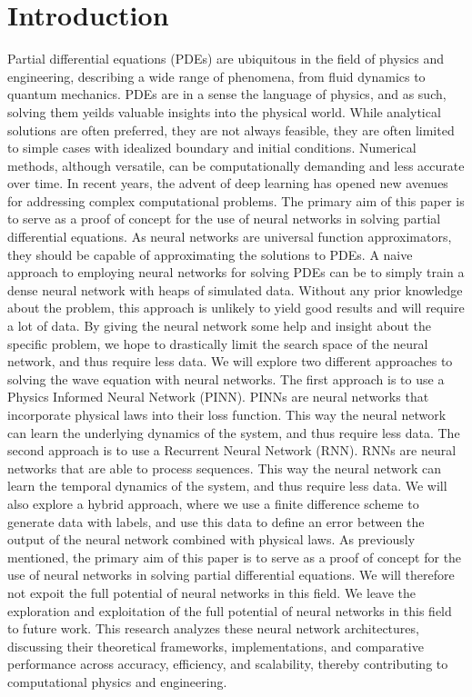 \documentclass[twoside,11pt]{report}
\begin{document}
\section*{Introduction}

    Partial differential equations (PDEs) are ubiquitous in the field of physics and engineering,
    describing a wide range of phenomena, from fluid dynamics to quantum mechanics.
    PDEs are in a sense the language of physics, and as such, solving them yeilds valuable insights into
    the physical world. While analytical solutions are often preferred, they are not always feasible,
    they are often limited to simple cases with idealized boundary and initial conditions. Numerical methods, 
    although versatile, can be computationally 
    demanding and less accurate over time. In recent years, the advent 
    of deep learning has opened new avenues for addressing complex computational problems.
    The primary aim of this paper is to serve as a proof of concept for the use of neural networks in solving
    partial differential equations. As neural networks are universal function approximators, they should be 
    capable of approximating the solutions to PDEs. A naive approach to employing neural networks for solving
    PDEs can be to simply train a dense neural network with heaps of simulated data. Without any prior knowledge
    about the problem, this approach is unlikely to yield good results and will require a lot of data. 
    \cite{krishnapriyan2021characterizing} By giving the neural network some help and insight about the specific
    problem, we hope to drastically limit the search space of the neural network, and thus require less data.
    We will explore two different approaches to solving the wave equation with neural networks. The first approach
    is to use a Physics Informed Neural Network (PINN). PINNs are neural networks that incorporate physical laws
    into their loss function. This way the neural network can learn the underlying dynamics of the system, and
    thus require less data. The second approach is to use a Recurrent Neural Network (RNN). RNNs are neural networks
    that are able to process sequences. This way the neural network can learn the temporal dynamics of the system,
    and thus require less data. We will also explore a hybrid approach, where we use a finite difference scheme
    to generate data with labels, and use this data to define an error between the output of the neural network
    combined with physical laws. As previously mentioned, the primary aim of this paper is to serve as a proof
    of concept for the use of neural networks in solving partial differential equations. We will therefore
    not expoit the full potential of neural networks in this field.
    We leave the exploration and exploitation of the full potential of neural
    networks in this field to future work. 
    This research analyzes these neural network architectures, 
    discussing their theoretical frameworks, implementations, and comparative performance across accuracy, 
    efficiency, and scalability, thereby contributing to computational physics and engineering.
\end{document}
